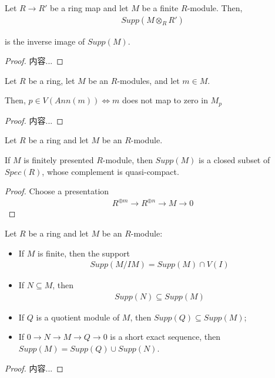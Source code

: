 \documentclass[Total.tex]{subfiles}
\begin{document}
			\begin{lemma}
				Let $R\rightarrow R'$ be a ring map and let $M$ be a finite $R$-module. Then,
				\begin{gather*}
					Supp(M\otimes_R R')
				\end{gather*}
				
				is the inverse image of $Supp(M)$.
			\end{lemma}
			\begin{proof}
				内容...
			\end{proof}
			
			\begin{lemma}
				Let $R$ be a ring, let $M$ be an $R$-modules, and let $m\in M$.
				
				Then, $p\in V(Ann(m))\Leftrightarrow m$ does not map to zero in $M_p$
			\end{lemma}
			\begin{proof}
				内容...
			\end{proof}
			
			\begin{lemma}
				Let $R$ be a ring and let $M$ be an $R$-module.
				
				If $M$ is finitely presented $R$-module, then $Supp(M)$ is a closed subset of $Spec(R)$, whose complement is quasi-compact.
			\end{lemma}
			\begin{proof}
				Choose a presentation
				\begin{gather*}
					R^{\oplus m}\rightarrow R^{\oplus n}\rightarrow M\rightarrow 0
				\end{gather*}
				
				
			\end{proof}
			
			\begin{lemma}
				Let $R$ be a ring and let $M$ be an $R$-module:
				\begin{itemize}
					\item If $M$ is finite, then the support
					\begin{gather*}
						Supp(M/IM)=Supp(M)\cap V(I)
					\end{gather*}
					\item If $N\subseteq M$, then
					\begin{gather*}
						Supp(N)\subseteq Supp(M)
					\end{gather*}
					\item If $Q$ is a quotient module of $M$, then $Supp(Q)\subseteq Supp(M)$;
					\item If $0\rightarrow N\rightarrow M\rightarrow Q\rightarrow 0$ is a short exact sequence, then $Supp(M)=Supp(Q)\cup Supp(N)$.
				\end{itemize}
			\end{lemma}
			\begin{proof}
				内容...
			\end{proof}
\end{document}
